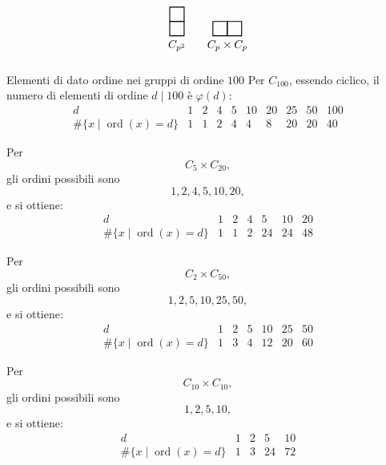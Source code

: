\documentclass[a4paper]{article}
\begin{document}
\begin{radioactive}
\[
    \begin{tikzpicture}[scale=0.45]
        \foreach \x/\h in {0/2} {
            \foreach \y in {1,...,\h} {
                \draw[thick] (\x,\y-1) rectangle (\x+1,\y);
            }
        }
        \node at (0.5,-0.7) {\(C_{p^2}\)};

        \begin{scope}[xshift=3cm]
            \foreach \x/\h in {0/1,1/1} {
                \foreach \y in {1,...,\h} {
                    \draw[thick] (\x,\y-1) rectangle (\x+1,\y);
                }
            }
            \node at (1,-0.7) {\(C_p\times C_p\)};
        \end{scope}
    \end{tikzpicture}
\]
\end{radioactive}

\begin{radioactive}
\begin{snippetexample}{Elementi di dato ordine nei gruppi di ordine \(100\)}
    Per \(C_{100}\), essendo ciclico, il numero di elementi di ordine \(d\mid 100\) è \(\varphi(d)\):
    \[
        \begin{array}{c|ccccccccc}
            d & 1 & 2 & 4 & 5 & 10 & 20 & 25 & 50 & 100\\
            \hline
            \#\{x\mid \operatorname{ord}(x)=d\}
              & 1 & 1 & 2 & 4 & 4 & 8 & 20 & 20 & 40
        \end{array}
    \]

    Per
    \[
        C_5\times C_{20},
    \]
    gli ordini possibili sono
    \[
        1,2,4,5,10,20,
    \]
    e si ottiene:
    \[
        \begin{array}{c|cccccc}
            d & 1 & 2 & 4 & 5 & 10 & 20\\
            \hline
            \#\{x\mid \operatorname{ord}(x)=d\}
              & 1 & 1 & 2 & 24 & 24 & 48
        \end{array}
    \]

    Per
    \[
        C_2\times C_{50},
    \]
    gli ordini possibili sono
    \[
        1,2,5,10,25,50,
    \]
    e si ottiene:
    \[
        \begin{array}{c|cccccc}
            d & 1 & 2 & 5 & 10 & 25 & 50\\
            \hline
            \#\{x\mid \operatorname{ord}(x)=d\}
              & 1 & 3 & 4 & 12 & 20 & 60
        \end{array}
    \]

    Per
    \[
        C_{10}\times C_{10},
    \]
    gli ordini possibili sono
    \[
        1,2,5,10,
    \]
    e si ottiene:
    \[
        \begin{array}{c|cccc}
            d & 1 & 2 & 5 & 10\\
            \hline
            \#\{x\mid \operatorname{ord}(x)=d\}
              & 1 & 3 & 24 & 72
        \end{array}
    \]
\end{snippetexample}
\end{radioactive}
\end{document}
